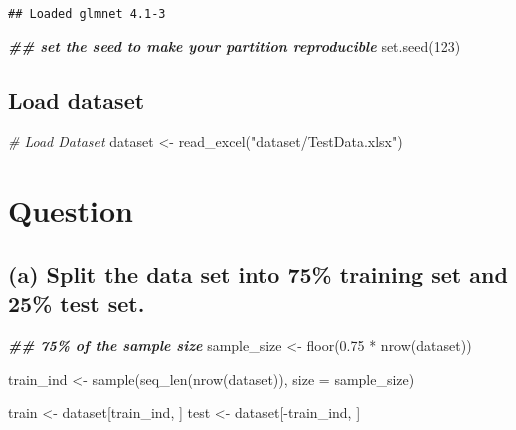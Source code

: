 \documentclass[
]{article}
\newenvironment{Shaded}{\begin{snugshade}}{\end{snugshade}}
\newcommand{\AttributeTok}[1]{\textcolor[rgb]{0.77,0.63,0.00}{#1}}
\newcommand{\CommentTok}[1]{\textcolor[rgb]{0.56,0.35,0.01}{\textit{#1}}}
\newcommand{\DecValTok}[1]{\textcolor[rgb]{0.00,0.00,0.81}{#1}}
\newcommand{\DocumentationTok}[1]{\textcolor[rgb]{0.56,0.35,0.01}{\textbf{\textit{#1}}}}
\newcommand{\FloatTok}[1]{\textcolor[rgb]{0.00,0.00,0.81}{#1}}
\newcommand{\FunctionTok}[1]{\textcolor[rgb]{0.00,0.00,0.00}{#1}}
\newcommand{\NormalTok}[1]{#1}
\newcommand{\OtherTok}[1]{\textcolor[rgb]{0.56,0.35,0.01}{#1}}
\newcommand{\SpecialCharTok}[1]{\textcolor[rgb]{0.00,0.00,0.00}{#1}}
\newcommand{\StringTok}[1]{\textcolor[rgb]{0.31,0.60,0.02}{#1}}
\begin{document}
\begin{verbatim}
## Loaded glmnet 4.1-3
\end{verbatim}

\begin{Shaded}
\begin{Highlighting}[]
\DocumentationTok{\#\# set the seed to make your partition reproducible}
\FunctionTok{set.seed}\NormalTok{(}\DecValTok{123}\NormalTok{)}
\end{Highlighting}
\end{Shaded}

\hypertarget{load-dataset}{%
\subsection{Load dataset}\label{load-dataset}}

\begin{Shaded}
\begin{Highlighting}[]
\CommentTok{\# Load Dataset}
\NormalTok{dataset }\OtherTok{\textless{}{-}} \FunctionTok{read\_excel}\NormalTok{(}\StringTok{"dataset/TestData.xlsx"}\NormalTok{)}
\end{Highlighting}
\end{Shaded}

\hypertarget{question}{%
\section{Question}\label{question}}

\hypertarget{a-split-the-data-set-into-75-training-set-and-25-test-set.}{%
\subsection{(a) Split the data set into 75\% training set and 25\% test
set.}\label{a-split-the-data-set-into-75-training-set-and-25-test-set.}}

\begin{Shaded}
\begin{Highlighting}[]
\DocumentationTok{\#\# 75\% of the sample size}
\NormalTok{sample\_size }\OtherTok{\textless{}{-}} \FunctionTok{floor}\NormalTok{(}\FloatTok{0.75} \SpecialCharTok{*} \FunctionTok{nrow}\NormalTok{(dataset))}


\NormalTok{train\_ind }\OtherTok{\textless{}{-}} \FunctionTok{sample}\NormalTok{(}\FunctionTok{seq\_len}\NormalTok{(}\FunctionTok{nrow}\NormalTok{(dataset)), }\AttributeTok{size =}\NormalTok{ sample\_size)}

\NormalTok{train }\OtherTok{\textless{}{-}}\NormalTok{ dataset[train\_ind, ]}
\NormalTok{test }\OtherTok{\textless{}{-}}\NormalTok{ dataset[}\SpecialCharTok{{-}}\NormalTok{train\_ind, ]}
\end{Highlighting}
\end{Shaded}
\end{document}
